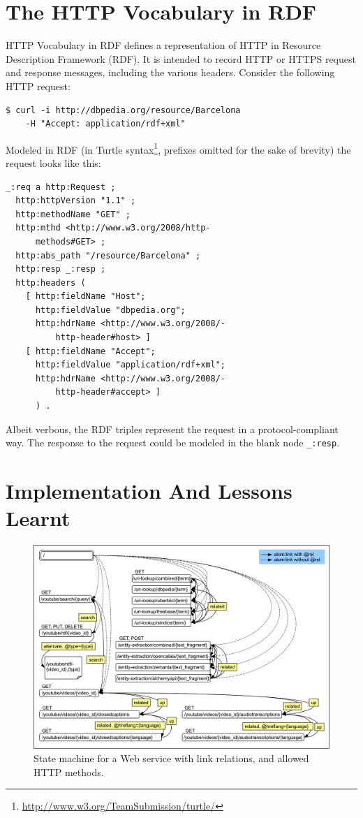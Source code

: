 \documentclass{acm_proc_article-sp}
\begin{document}
\section{The HTTP Vocabulary in RDF}\label{sec:httpvocab}
HTTP Vocabulary in RDF\cite{HTTP:RDF} defines a representation of HTTP in Resource Description Framework (RDF)\cite{W3C:RDF}. It is intended to record HTTP or HTTPS request and response messages, including the various headers. Consider the following HTTP request:
\begin{verbatim}
$ curl -i http://dbpedia.org/resource/Barcelona
    -H "Accept: application/rdf+xml"
\end{verbatim}
Modeled in RDF (in Turtle syntax\footnote{\url{http://www.w3.org/TeamSubmission/turtle/}}, prefixes omitted for the sake of brevity) the request looks like this:
\begin{verbatim}
_:req a http:Request ;
  http:httpVersion "1.1" ;
  http:methodName "GET" ;
  http:mthd <http://www.w3.org/2008/http-
      methods#GET> ;
  http:abs_path "/resource/Barcelona" ;
  http:resp _:resp ;
  http:headers (
    [ http:fieldName "Host";
      http:fieldValue "dbpedia.org";
      http:hdrName <http://www.w3.org/2008/-
          http-header#host> ]
    [ http:fieldName "Accept";
      http:fieldValue "application/rdf+xml";
      http:hdrName <http://www.w3.org/2008/-
          http-header#accept> ]
      ) .
\end{verbatim}
Albeit verbous, the RDF triples represent the request in a protocol-compliant way. The response to the request could be modeled in the blank node \texttt{\_:resp}.

\section{Implementation And Lessons Learnt}\label{sec:implementation}
\begin{figure}
 \centering
 \includegraphics[width=\linewidth]{statemachine.png}
 \caption{State machine for a Web service with link relations, and allowed HTTP methods.}
 \label{fig:statemachine}
\end{figure}
\end{document}
